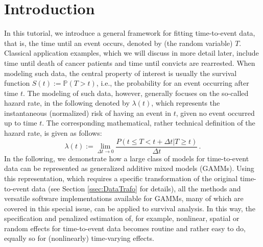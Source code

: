 \documentclass[submit]{smj}
\begin{document}
\maketitle

\section{Introduction} \label{sec:intro}
In this tutorial, we introduce a general framework for fitting time-to-event
data, that is, the time until an event occurs, denoted by (the random variable)
$T$. Classical application examples, which we will discuss in more detail later,
include time until death of cancer patients and time until convicts are rearrested.
When modeling such data, the central property of interest is usually
the survival function $S(t):=\mathbb{P}(T > t)$, i.e., the
probability for an event occurring after time $t$. The modeling of such data,
however, generally focuses on the so-called hazard rate, in the following denoted
by $\lambda(t)$, which represents the instantaneous (normalized)
risk of having an event in $t$, given no event occurred up to time $t$.
The corresponding mathematical, rather technical definition of the hazard rate,
is given as follows:
\begin{equation}
  \lambda(t) := \lim\limits_{\Delta t \to 0} \frac{P(t\leq T <t+\Delta t | T\geq t)}{\Delta t}\, .
\end{equation}
In the following, we demonstrate how a large class of models for time-to-event
data can be represented as generalized additive mixed models (GAMMs).
Using this representation, which requires a specific transformation of the
original time-to-event data (see Section \ref{ssec:DataTrafo} for details), all
the methods and versatile software implementations available for GAMMs, many
of which are covered in this special issue, can be applied to survival analysis.
In this way, the specification and penalized estimation of, for example,
nonlinear, spatial or random effects for time-to-event data becomes routine and
rather easy to do, equally so for (nonlinearly) time-varying effects.
\end{document}
